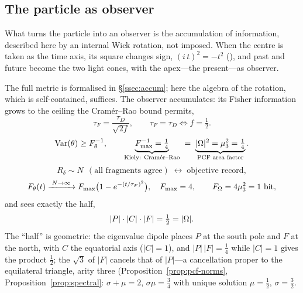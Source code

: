 \subsection{The particle as observer}\label{ssec:observer}

What turns the particle into an observer is the accumulation of information, described
here by an internal Wick rotation, not imposed. When the centre is taken
as the time axis, its square changes sign, $(i\,t)^2=-t^2$ (), and past and future become the two light cones, with the
apex---the present---as observer.


The full metric is formalised in \S\ref{ssec:accum}; here the algebra of the rotation, which
is self-contained, suffices. The observer accumulates: its Fisher information grows to the
ceiling the Cram\'er--Rao bound permits,
\begin{equation}\label{eq:obs-fishertime}
  \tau_F=\frac{\tau_D}{\sqrt{2f}},\qquad \tau_F=\tau_D\iff f=\tfrac12 .
\end{equation}\begin{equation}\label{eq:obs-cramerrao}
  \mathrm{Var}(\theta)\ge F_\theta^{-1},\qquad
  \underbrace{F_{\max}^{-1}=\tfrac14}_{\text{Kiely: Cram\'er--Rao}}
   \;=\;\underbrace{|\Omega|^{2}=\mu_3^{2}=\tfrac14}_{\text{PCF area factor}} .
\end{equation}\begin{equation}\label{eq:obs-redundancy}
  R_\delta\sim N\ \ (\text{all fragments agree})\;\longleftrightarrow\;\text{objective record},
\end{equation}\begin{equation}\label{eq:obs-accum}
  F_\theta(t)\xrightarrow{\;N\to\infty\;}F_{\max}\big(1-e^{-(t/\tau_F)^{2}}\big),\quad F_{\max}=4,
  \qquad F_\Omega=4\mu_3^{2}=1\ \text{bit},
\end{equation}
and sees exactly the half,
\begin{equation}\label{eq:obs-half}
  |P|\cdot|C|\cdot|F|=\tfrac12=|\Omega| .
\end{equation}
The ``half'' is geometric: the eigenvalue dipole places $P$ at the south pole and $F$ at
the north, with $C$ the equatorial axis ($|C|=1$), and $|P|\,|F|=\tfrac14$ while $|C|=1$
gives the product $\tfrac12$; the $\sqrt3$ of $|F|$ cancels that of $|P|$---a cancellation
proper to the equilateral triangle, arity three (Proposition~\ref{prop:pcf-norms},
Proposition~\ref{prop:spectral}: $\sigma+\mu=2$, $\sigma\mu=\tfrac34$ with unique solution
$\mu=\tfrac12$, $\sigma=\tfrac32$.


